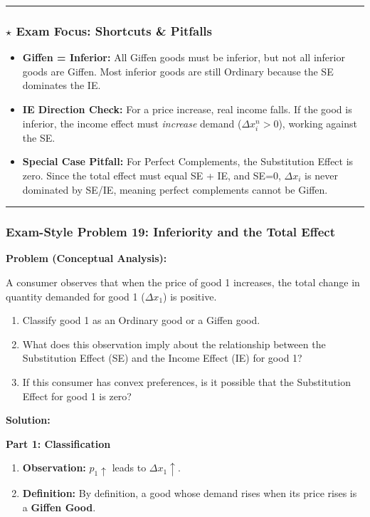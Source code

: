 \documentclass{article}
\begin{document}
\noindent\rule{\linewidth}{0.4pt}

\subsubsection*{$\star$ Exam Focus: Shortcuts \& Pitfalls}
\begin{itemize}
    \item \textbf{Giffen = Inferior:} All Giffen goods must be inferior, but not all inferior goods are Giffen. Most inferior goods are still Ordinary because the SE dominates the IE.
    \item \textbf{IE Direction Check:} For a price increase, real income falls. If the good is inferior, the income effect must \textit{increase} demand ($\Delta x_i^n > 0$), working against the SE.
    \item \textbf{Special Case Pitfall:} For Perfect Complements, the Substitution Effect is zero. Since the total effect must equal SE + IE, and SE=0, $\Delta x_i$ is never dominated by SE/IE, meaning perfect complements cannot be Giffen.
\end{itemize}

\noindent\rule{\linewidth}{0.4pt}

\subsubsection*{Exam-Style Problem 19: Inferiority and the Total Effect}
\textbf{Problem (Conceptual Analysis):}

A consumer observes that when the price of good 1 increases, the total change in quantity demanded for good 1 ($\Delta x_1$) is positive.
\begin{enumerate}
    \item Classify good 1 as an Ordinary good or a Giffen good.
    \item What does this observation imply about the relationship between the Substitution Effect (SE) and the Income Effect (IE) for good 1?
    \item If this consumer has convex preferences, is it possible that the Substitution Effect for good 1 is zero?
\end{enumerate}

\textbf{Solution:}

\textbf{Part 1: Classification}
\begin{enumerate}
    \item \textbf{Observation:} $p_1 \uparrow$ leads to $\Delta x_1 \uparrow$.
    \item \textbf{Definition:} By definition, a good whose demand rises when its price rises is a \textbf{Giffen Good}.
\end{enumerate}
\end{document}
